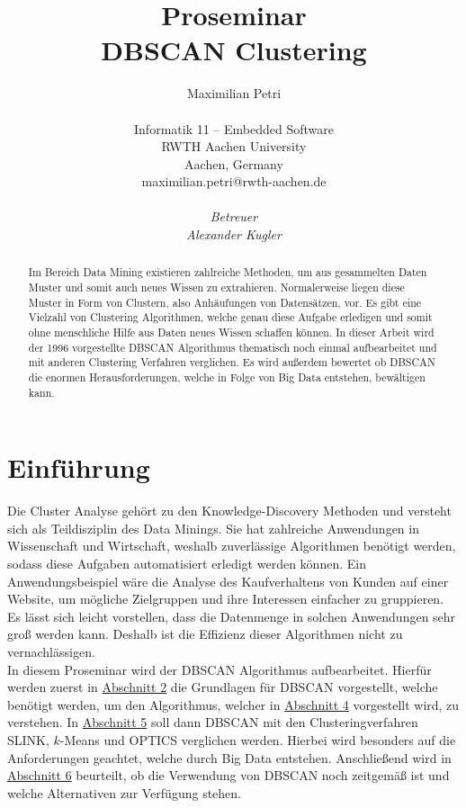 \documentclass{lni}
\author{
	Maximilian Petri \\ 
	\\ 
	Informatik 11 -- Embedded Software \\ 
	RWTH Aachen University \\ 
	Aachen, Germany \\ 
	maximilian.petri@rwth-aachen.de\\
	\\
	\textit{Betreuer}\\
	\textit{Alexander Kugler}\\ 
}
\title{\small{Proseminar} \\ \vspace{0.5cm} \Large{DBSCAN Clustering}}
\begin{document}
\maketitle

%
%

\begin{abstract}
Im Bereich Data Mining existieren zahlreiche Methoden, um aus gesammelten Daten Muster und somit auch neues Wissen zu extrahieren. Normalerweise liegen diese Muster in Form von Clustern, also Anhäufungen von Datensätzen, vor. Es gibt eine Vielzahl von Clustering Algorithmen, welche genau diese Aufgabe erledigen und somit ohne menschliche Hilfe aus Daten neues Wissen schaffen können. In dieser Arbeit wird der 1996 vorgestellte DBSCAN Algorithmus thematisch noch einmal aufbearbeitet und mit anderen Clustering Verfahren verglichen. Es wird außerdem bewertet ob DBSCAN die enormen Herausforderungen, welche in Folge von Big Data entstehen, bewältigen kann.
\end{abstract}

%
%

\section{Einführung}
Die Cluster Analyse gehört zu den Knowledge-Discovery Methoden und versteht sich als Teildisziplin des Data Minings. Sie hat zahlreiche Anwendungen in Wissenschaft und Wirtschaft, weshalb zuverlässige Algorithmen benötigt werden, sodass diese Aufgaben automatisiert erledigt werden können. Ein Anwendungsbeispiel wäre die Analyse des Kaufverhaltens von Kunden auf einer Website, um mögliche Zielgruppen und ihre Interessen einfacher zu gruppieren. Es lässt sich leicht vorstellen, dass die Datenmenge in solchen Anwendungen sehr groß werden kann. Deshalb ist die Effizienz dieser Algorithmen nicht zu vernachlässigen.\\
In diesem Proseminar wird der DBSCAN Algorithmus aufbearbeitet. Hierfür werden zuerst in \hyperref[sec:grund]{Abschnitt 2} die Grundlagen für DBSCAN vorgestellt, welche benötigt werden, um den Algorithmus, welcher in \hyperref[sec:kern]{Abschnitt 4} vorgestellt wird, zu verstehen.
In \hyperref[sec:perf]{Abschnitt 5} soll dann DBSCAN mit den Clusteringverfahren SLINK, $k$-Means und OPTICS verglichen werden. Hierbei wird besonders auf die Anforderungen geachtet, welche durch Big Data entstehen. Anschließend wird in \hyperref[sec:fazit]{Abschnitt 6} beurteilt, ob die Verwendung von DBSCAN noch zeitgemäß ist und welche Alternativen zur Verfügung stehen.
\end{document}
